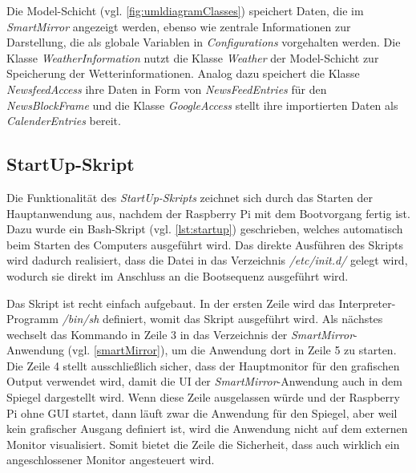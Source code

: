  Die Model-Schicht (vgl. \autoref{fig:umldiagramClasses}) speichert Daten, die im \textit{SmartMirror} angezeigt werden, ebenso wie zentrale Informationen zur Darstellung, die als globale Variablen in \textit{Configurations} vorgehalten werden. Die Klasse \textit{WeatherInformation} nutzt die Klasse \textit{Weather} der Model-Schicht zur Speicherung der Wetterinformationen. 
 Analog dazu speichert die Klasse \textit{NewsfeedAccess} ihre Daten in Form von \textit{NewsFeedEntries} für den \textit{NewsBlockFrame} und die Klasse \textit{GoogleAccess} stellt ihre importierten Daten  als \textit{CalenderEntries} bereit.
 

\subsection{StartUp-Skript}
\label{subsec:startup}
Die Funktionalität des \textit{StartUp-Skripts} zeichnet sich durch das Starten der Hauptanwendung aus, nachdem der Raspberry Pi mit dem Bootvorgang fertig ist. Dazu wurde ein Bash-Skript (vgl. \autoref{lst:startup}) geschrieben, welches automatisch beim Starten des Computers ausgeführt wird. 
Das direkte Ausführen des Skripts wird dadurch realisiert, dass die Datei in das Verzeichnis \textit{/etc/init.d/} gelegt wird, wodurch sie direkt im Anschluss an die Bootsequenz ausgeführt wird. \cite{nemeth2006linux}

\begin{minipage}{\textwidth}
	
\end{minipage} 

Das Skript ist recht einfach aufgebaut. In der ersten Zeile wird das Interpreter-Programm \textit{/bin/sh} definiert, womit das Skript ausgeführt wird. Als nächstes wechselt das Kommando in Zeile 3 in das Verzeichnis der \textit{SmartMirror}-Anwendung (vgl. \autoref{smartMirror}), um die Anwendung dort in Zeile 5 zu starten. Die Zeile 4 stellt ausschließlich sicher, dass der Hauptmonitor für den grafischen Output verwendet wird, damit die UI der \textit{SmartMirror}-Anwendung auch in dem Spiegel dargestellt wird. Wenn diese Zeile ausgelassen würde und der Raspberry Pi ohne GUI startet, dann läuft zwar die Anwendung für den Spiegel, aber weil kein grafischer Ausgang definiert ist, wird die Anwendung nicht auf dem externen Monitor visualisiert. Somit bietet die Zeile die Sicherheit, dass auch wirklich ein angeschlossener Monitor angesteuert wird.

